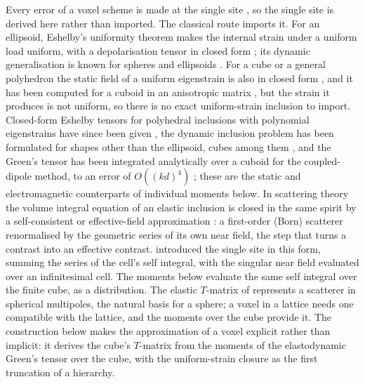 \documentclass[11pt,a4paper]{article}
\begin{document}
Every error of a voxel scheme is made at the single site \citep{NestorError2026}, so the single
site is derived here rather than imported. The classical route imports it. For an ellipsoid,
Eshelby's uniformity theorem makes the internal strain under a uniform load uniform, with a
depolarisation tensor in closed form \citep{Eshelby1957,Eshelby1959,Mura1987}; its dynamic
generalisation is known for spheres and ellipsoids \citep{FuMura1983,Mikata1990,Michelitsch2003}. For a
cube or a general polyhedron the static field of a uniform eigenstrain is also in closed form
\citep{Chiu1977,Rodin1996,Nozaki2001}, and it has been computed for a cuboid in an anisotropic matrix
\citep{LeeJohnson1978}, but the strain it produces is not uniform, so there is no exact uniform-strain
inclusion to import. Closed-form Eshelby tensors for polyhedral
inclusions with polynomial eigenstrains have since been given \citep{WuZhangYin2021}, the dynamic
inclusion problem has been formulated for shapes other than the ellipsoid, cubes among them
\citep{WangMichelitsch2005}, and the Green's tensor has been integrated analytically over a cuboid for
the coupled-dipole method, to an error of $O((kd)^4)$ \citep{YurkinSmunev2023}; these are the static
and electromagnetic counterparts of individual moments below. In scattering theory the volume integral
equation of an elastic inclusion \citep{Gubernatis1977} is closed in the same spirit by a
self-consistent or effective-field approximation \citep{MalKnopoff1967,Kanaun2008}: a first-order (Born) scatterer
\citep{Wu1985} renormalised by the geometric series of its own near field, the step that turns a
contrast into an effective contrast. \citet{Nestor1996} introduced the single site in this form,
summing the series of the cell's self integral, with the singular near field evaluated over an
infinitesimal cell. The moments below evaluate the same self integral over the finite cube, as a
distribution. The elastic $T$-matrix of \citet{Waterman1976} represents a
scatterer in spherical multipoles, the natural basis for a sphere; a voxel in a lattice needs one
compatible with the lattice, and the moments over the cube provide it. The construction below makes the
approximation of a voxel explicit rather than implicit: it derives the cube's $T$-matrix from
the moments of the elastodynamic Green's tensor over the cube, with the uniform-strain closure as the
first truncation of a hierarchy.
\end{document}
